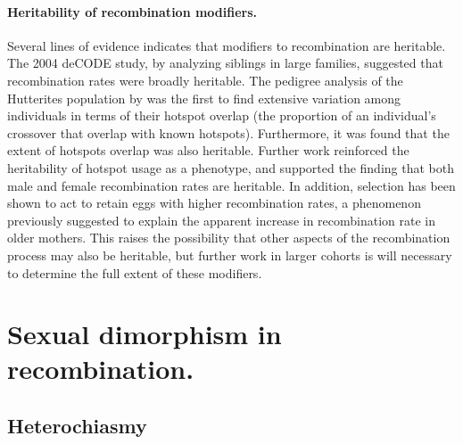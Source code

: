 \paragraph{Heritability of recombination modifiers.}
Several lines of evidence indicates that modifiers to recombination are heritable.
The 2004 deCODE study, by analyzing siblings in large families, suggested that recombination rates were broadly heritable\cite{Kong2004}.
The pedigree analysis of the Hutterites population by \citet{Coop2008} was the first to find extensive variation among individuals in terms of their hotspot overlap (the proportion of an individual's crossover that overlap with known hotspots).
Furthermore, it was found that the extent of hotspots overlap was also heritable.
Further work reinforced the heritability of hotspot usage as a phenotype, and supported the finding that both male and female recombination rates are heritable\cite{Fledel-Alon2011}.
In addition, selection has been shown to act to retain eggs with higher recombination rates\cite{Ottolini2015}, a phenomenon previously suggested to explain the apparent increase in recombination rate in older mothers\cite{Kong2004}.
This raises the possibility that other aspects of the recombination process may also be heritable, but further work in larger cohorts is will necessary to determine the full extent of these modifiers.


\section{Sexual dimorphism in recombination.}
\subsection{Heterochiasmy}

